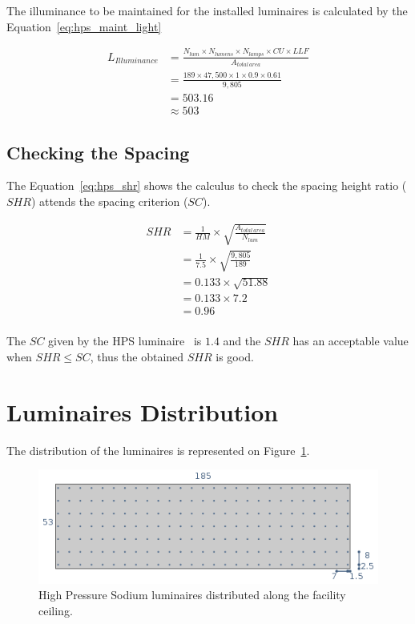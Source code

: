 The illuminance to be maintained for the installed luminaires is calculated by the Equation~\ref{eq:hps_maint_light}

\begin{equation}
\begin{split}
L_{Illuminance} & =
\frac {N_{lum} \times N_{lumens} \times N_{lamps} \times CU \times LLF}
      {A_{total\,area}} \\
 & = \frac{189 \times 47,500 \times 1 \times 0.9 \times 0.61}
          {9,805} \\
 & = 503.16 \\
 & \approx 503
\end{split}
\label{eq:hps_maint_light}
\end{equation}

\subsection{Checking the Spacing}
The Equation~\ref{eq:hps_shr} shows the calculus to check the spacing height ratio ($SHR$) attends the spacing criterion ($SC$).

\begin{equation}
\begin{split}
SHR & = \frac {1}{HM} \times \sqrt{\frac{A_{total\,area}}{N_{lum}}} \\
 & = \frac {1}{7.5} \times \sqrt{\frac{9,805}{189}} \\
 & = 0.133 \times \sqrt{51.88} \\
 & = 0.133 \times 7.2 \\
 & = 0.96 \\
\end{split}
\label{eq:hps_shr}
\end{equation}

The $SC$ given by the HPS luminaire~\cite{www:hps_photometric} is $1.4$ and the $SHR$ has an acceptable value when $SHR \leq SC$, thus the obtained $SHR$ is good.

\section{Luminaires Distribution}
The distribution of the luminaires is represented on Figure~\ref{fig:hps_dist}.
\begin{figure}[h!]
\centering
\includegraphics[width=.9\textwidth]{./figs/hps_dist.png}
\caption{High Pressure Sodium luminaires distributed along the facility ceiling.}
\label{fig:hps_dist}
\end{figure}

